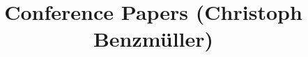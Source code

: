 \documentclass{article}
\begin{document}
\title{Conference Papers (Christoph Benzm{\"u}ller)}
\maketitle
\nocite{*}

%

\end{document}
